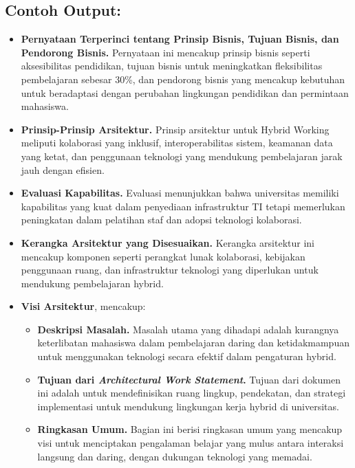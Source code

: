 \subsection*{Contoh Output:}
\begin{itemize}
	\item \textbf{Pernyataan Terperinci tentang Prinsip Bisnis, Tujuan Bisnis, dan Pendorong Bisnis.} 
	Pernyataan ini mencakup prinsip bisnis seperti aksesibilitas pendidikan, tujuan bisnis untuk meningkatkan fleksibilitas pembelajaran sebesar 30\%, dan pendorong bisnis yang mencakup kebutuhan untuk beradaptasi dengan perubahan lingkungan pendidikan dan permintaan mahasiswa.
	
	\item \textbf{Prinsip-Prinsip Arsitektur.} 
	Prinsip arsitektur untuk Hybrid Working meliputi kolaborasi yang inklusif, interoperabilitas sistem, keamanan data yang ketat, dan penggunaan teknologi yang mendukung pembelajaran jarak jauh dengan efisien.
	
	\item \textbf{Evaluasi Kapabilitas.} 
	Evaluasi menunjukkan bahwa universitas memiliki kapabilitas yang kuat dalam penyediaan infrastruktur TI tetapi memerlukan peningkatan dalam pelatihan staf dan adopsi teknologi kolaborasi.
	
	\item \textbf{Kerangka Arsitektur yang Disesuaikan.} 
	Kerangka arsitektur ini mencakup komponen seperti perangkat lunak kolaborasi, kebijakan penggunaan ruang, dan infrastruktur teknologi yang diperlukan untuk mendukung pembelajaran hybrid.
	
	\item \textbf{Visi Arsitektur}, mencakup:
	\begin{itemize}
		\item \textbf{Deskripsi Masalah.} 
		Masalah utama yang dihadapi adalah kurangnya keterlibatan mahasiswa dalam pembelajaran daring dan ketidakmampuan untuk menggunakan teknologi secara efektif dalam pengaturan hybrid.
		
		\item \textbf{Tujuan dari \textit{Architectural Work Statement}.} 
		Tujuan dari dokumen ini adalah untuk mendefinisikan ruang lingkup, pendekatan, dan strategi implementasi untuk mendukung lingkungan kerja hybrid di universitas.
		
		\item \textbf{Ringkasan Umum.} 
		Bagian ini berisi ringkasan umum yang mencakup visi untuk menciptakan pengalaman belajar yang mulus antara interaksi langsung dan daring, dengan dukungan teknologi yang memadai.
		

\end{itemize}
\end{itemize}
